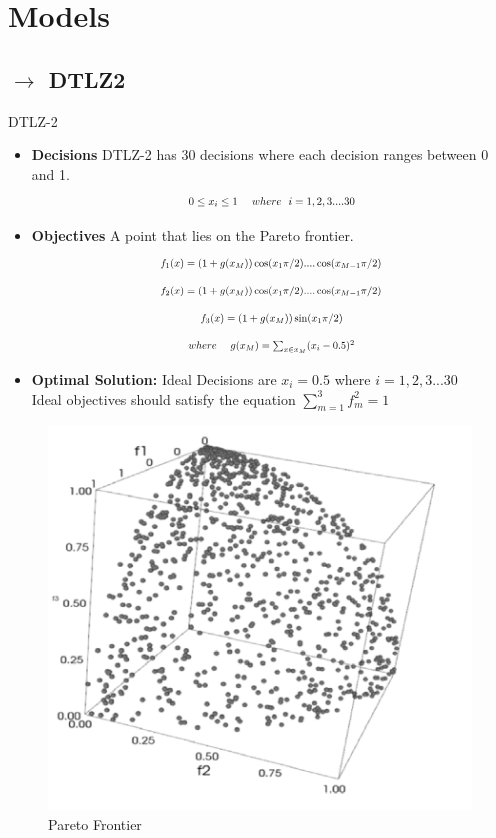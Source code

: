 \documentclass[10pt]{beamer}
\newcommand*{\Scale}[2][4]{\scalebox{#1}{$#2$}}%
\begin{document}
\section{Models}
\subsection{$\rightarrow$ DTLZ2}
\begin{frame}{DTLZ-2}
  \begin{minipage}{0.60\linewidth}
  \footnotesize{
  \begin{itemize}
  \item \textbf{Decisions} DTLZ-2 has 30 decisions where each decision ranges between 0 and 1.
  \[\Scale[0.8]{0 \leq {x}_{i} \leq 1 \ \ \ \ where \ \  i = 1,2 ,3 .... 30}\]
  \item \textbf{Objectives} A point that lies on the Pareto frontier.
  \[\Scale[0.75]{{f}_{1}(x) = (1+g({x}_{M}))\cos({x}_{1} \pi/2)....\cos({x}_{M-1} \pi/2)}\]
  \[\Scale[0.75]{{f}_{2}(x) = (1+g({x}_{M}))\cos({x}_{1} \pi/2)....\cos({x}_{M-1} \pi/2)}\]
  \[\Scale[0.75]{{f}_{3}(x) = (1+g({x}_{M}))\sin({x}_{1} \pi/2)}\]
  \[\Scale[0.75]{where \ \ \ \ g({x}_{M}) = \sum_{x \in {x}_{M}} (x_i - 0.5)^2} \]
  \item \textbf{Optimal Solution:} Ideal Decisions are $x_i=0.5$ where $i=1,2,3...30$
  \\
  Ideal objectives should satisfy the equation $\sum_{m=1}^{3} f_m^2 = 1$
  \end{itemize}}
  \end{minipage}
  \noindent
  \begin{minipage}{0.35\linewidth}
  \begin{figure}
  \centering
  \includegraphics[width=\linewidth]{figures/dtlz2pf}
  \caption{Pareto Frontier}
  \label{fig:de_pf}
  \end{figure}
  \end{minipage}
\end{frame}
  
\end{document}
